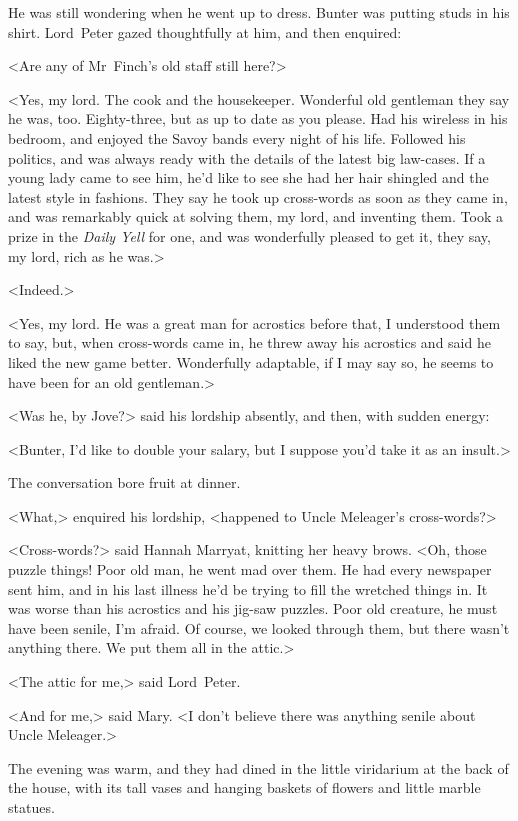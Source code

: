 He was still wondering when he went up to dress. Bunter was putting studs in his shirt. Lord~Peter gazed thoughtfully at him, and then enquired:

<Are any of Mr~Finch's old staff still here?>

<Yes, my lord. The cook and the housekeeper. Wonderful old gentleman they say he was, too. Eighty-three, but as up to date as you please. Had his wireless in his bedroom, and enjoyed the Savoy bands every night of his life. Followed his politics, and was always ready with the details of the latest big law-cases. If a young lady came to see him, he'd like to see she had her hair shingled and the latest style in fashions. They say he took up cross-words as soon as they came in, and was remarkably quick at solving them, my lord, and inventing them. Took a  prize in the \textit{Daily Yell} for one, and was wonderfully pleased to get it, they say, my lord, rich as he was.>

<Indeed.>

<Yes, my lord. He was a great man for acrostics before that, I understood them to say, but, when cross-words came in, he threw away his acrostics and said he liked the new game better. Wonderfully adaptable, if I may say so, he seems to have been for an old gentleman.>

<Was he, by Jove?> said his lordship absently, and then, with sudden energy:

<Bunter, I'd like to double your salary, but I suppose you'd take it as an insult.>

The conversation bore fruit at dinner.

<What,> enquired his lordship, <happened to Uncle Meleager's cross-words?>

<Cross-words?> said Hannah Marryat, knitting her heavy brows. <Oh, those puzzle things! Poor old man, he went mad over them. He had every newspaper sent him, and in his last illness he'd be trying to fill the wretched things in. It was worse than his acrostics and his jig-saw puzzles. Poor old creature, he must have been senile, I'm afraid. Of course, we looked through them, but there wasn't anything there. We put them all in the attic.>

<The attic for me,> said Lord~Peter.

<And for me,> said Mary. <I don't believe there was anything senile about Uncle Meleager.>

The evening was warm, and they had dined in the little viridarium at the back of the house, with its tall vases and hanging baskets of flowers and little marble statues.

